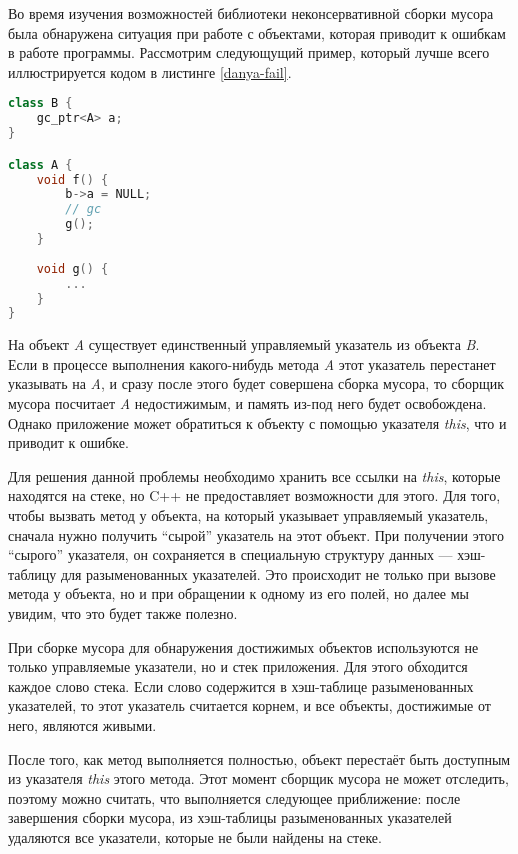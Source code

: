 \documentclass[14pt]{matmex-diploma}
\begin{document}
Во время изучения возможностей библиотеки неконсервативной сборки мусора была обнаружена ситуация при работе с объектами, которая приводит к ошибкам в работе программы. Рассмотрим следующущий пример, который лучше всего иллюстрируется кодом в листинге \ref{danya-fail}.

\begin{lstlisting}[caption = Пример ошибки\label{danya-fail},language=C++]
class B {
    gc_ptr<A> a;
}

class A {
    void f() {
        b->a = NULL;
        // gc
        g();
    }
    
    void g() {
        ...
    }
}
\end{lstlisting}


На объект \textit{A} существует единственный управляемый указатель из объекта \textit{B}. Если в процессе выполнения какого-нибудь метода \textit{A} этот указатель перестанет указывать на \textit{A}, и сразу после этого будет совершена
сборка мусора, то сборщик мусора посчитает \textit{A} недостижимым, и память из-под него
будет освобождена. Однако приложение может обратиться к объекту с помощью
указателя \textit{this}, что и приводит к ошибке.

Для решения данной проблемы необходимо хранить все ссылки на \textit{this},
которые находятся на стеке, но C++ не предоставляет возможности для этого. 
Для того, чтобы вызвать метод у объекта, на который
указывает управляемый указатель, сначала нужно получить ``сырой'' указатель на этот
объект. При получении этого ``сырого'' указателя, он сохраняется в специальную структуру данных --- хэш-таблицу для разыменованных указателей.
Это происходит не только при вызове метода у объекта, но и при обращении к одному из
его полей, но далее мы увидим, что это будет также полезно.

При сборке мусора для обнаружения достижимых объектов используются не только 
управляемые указатели, но и стек приложения. Для этого обходится каждое слово стека.
Если слово содержится в хэш-таблице разыменованных указателей, то этот указатель считается корнем, и все объекты, достижимые от него, являются живыми.

После того, как метод выполняется полностью, объект перестаёт быть доступным из
указателя \textit{this} этого метода. Этот момент сборщик мусора не может отследить,
поэтому можно считать, что выполняется следующее приближение: после завершения сборки мусора, из
хэш-таблицы разыменованных указателей удаляются все указатели, которые не были найдены на стеке.
\end{document}
